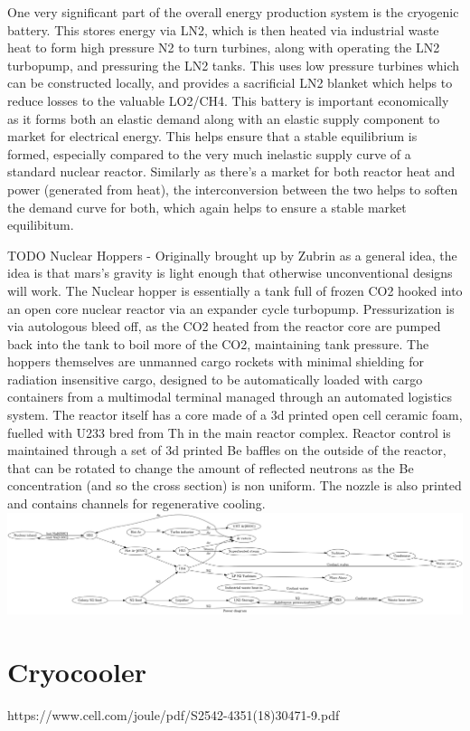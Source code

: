 \documentclass[10pt]{article}
\begin{document}
One very significant part of the overall energy production system is the cryogenic battery. This stores energy via LN2, which is then heated via industrial waste heat to form high pressure N2 to turn turbines, along with operating the LN2 turbopump, and pressuring the LN2 tanks. This uses low pressure turbines which can be constructed locally, and provides a sacrificial LN2 blanket which helps to reduce losses to the valuable LO2/CH4. This battery is important economically as it forms both an elastic demand along with an elastic supply component to market for electrical energy. This helps ensure that a stable equilibrium is formed, especially compared to the very much inelastic supply curve of a standard nuclear reactor. Similarly as there's a market for both reactor heat and power (generated from heat), the interconversion between the two helps to soften the demand curve for both, which again helps to ensure a stable market equilibitum.

TODO Nuclear Hoppers - Originally brought up by Zubrin as a general idea, the idea is that mars's gravity is light enough that otherwise unconventional designs will work. The Nuclear hopper is essentially a tank full of frozen CO2 hooked into an open core nuclear reactor via an expander cycle turbopump. Pressurization is via autologous bleed off, as the CO2 heated from the reactor core are pumped back into the tank to boil more of the CO2, maintaining tank pressure. The hoppers themselves are unmanned cargo rockets with minimal shielding for radiation insensitive cargo, designed to be automatically loaded with cargo containers from a multimodal terminal managed through an automated logistics system. The reactor itself has a core made of a 3d printed open cell ceramic foam, fuelled with U233 bred from Th in the main reactor complex. Reactor control is maintained through a set of 3d printed Be baffles on the outside of the reactor, that can be rotated to change the amount of reflected neutrons as the Be concentration (and so the cross section) is non uniform. The nozzle is also printed and contains channels for regenerative cooling.
\includegraphics[width=1\textwidth]{fig_power.png}


\section{Cryocooler}
https://www.cell.com/joule/pdf/S2542-4351(18)30471-9.pdf
\end{document}
